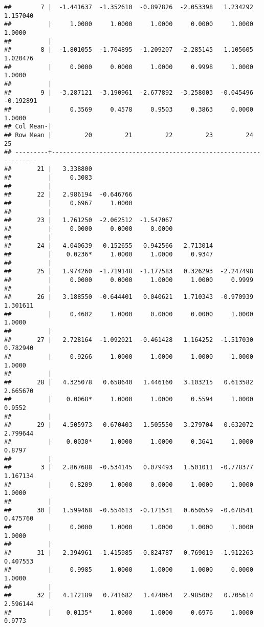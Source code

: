 \documentclass[12pt,]{article}
\begin{document}
\begin{verbatim}
##        7 |  -1.441637  -1.352610  -0.897826  -2.053398   1.234292   1.157040
##          |     1.0000     1.0000     1.0000     0.0000     1.0000     1.0000
##          |
##        8 |  -1.801055  -1.704895  -1.209207  -2.285145   1.105605   1.020476
##          |     0.0000     0.0000     1.0000     0.9998     1.0000     1.0000
##          |
##        9 |  -3.287121  -3.190961  -2.677892  -3.258003  -0.045496  -0.192891
##          |     0.3569     0.4578     0.9503     0.3863     0.0000     1.0000
## Col Mean-|
## Row Mean |         20         21         22         23         24         25
## ---------+------------------------------------------------------------------
##       21 |   3.338800
##          |     0.3083
##          |
##       22 |   2.986194  -0.646766
##          |     0.6967     1.0000
##          |
##       23 |   1.761250  -2.062512  -1.547067
##          |     0.0000     0.0000     0.0000
##          |
##       24 |   4.040639   0.152655   0.942566   2.713014
##          |    0.0236*     1.0000     1.0000     0.9347
##          |
##       25 |   1.974260  -1.719148  -1.177583   0.326293  -2.247498
##          |     0.0000     0.0000     1.0000     1.0000     0.9999
##          |
##       26 |   3.188550  -0.644401   0.040621   1.710343  -0.970939   1.301611
##          |     0.4602     1.0000     0.0000     0.0000     1.0000     1.0000
##          |
##       27 |   2.728164  -1.092021  -0.461428   1.164252  -1.517030   0.782940
##          |     0.9266     1.0000     1.0000     1.0000     1.0000     1.0000
##          |
##       28 |   4.325078   0.658640   1.446160   3.103215   0.613582   2.665670
##          |    0.0068*     1.0000     1.0000     0.5594     1.0000     0.9552
##          |
##       29 |   4.505973   0.670403   1.505550   3.279704   0.632072   2.799644
##          |    0.0030*     1.0000     1.0000     0.3641     1.0000     0.8797
##          |
##        3 |   2.867688  -0.534145   0.079493   1.501011  -0.778377   1.167134
##          |     0.8209     1.0000     0.0000     1.0000     1.0000     1.0000
##          |
##       30 |   1.599468  -0.554613  -0.171531   0.650559  -0.678541   0.475760
##          |     0.0000     1.0000     1.0000     1.0000     1.0000     1.0000
##          |
##       31 |   2.394961  -1.415985  -0.824787   0.769019  -1.912263   0.407553
##          |     0.9985     1.0000     1.0000     1.0000     0.0000     1.0000
##          |
##       32 |   4.172189   0.741682   1.474064   2.985002   0.705614   2.596144
##          |    0.0135*     1.0000     1.0000     0.6976     1.0000     0.9773

\end{verbatim}
\end{document}
